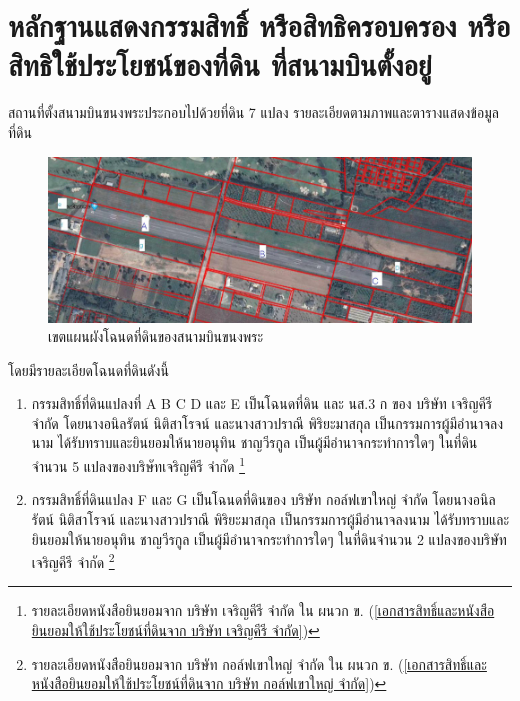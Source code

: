 \section{หลักฐานแสดงกรรมสิทธิ์ หรือสิทธิครอบครอง หรือสิทธิใช้ประโยชน์ของที่ดิน ที่สนามบินตั้งอยู่}

สถานที่ตั้งสนามบินขนงพระประกอบไปด้วยที่ดิน 7 แปลง รายละเอียดตามภาพและตารางแสดงข้อมูลที่ดิน

\begin{figure}[htbp]
\begin{center}
\includegraphics[width=\linewidth]{Picture7.png}
\caption{เขตแผนผังโฉนดที่ดินของสนามบินขนงพระ}
\label{default}
\end{center}
\end{figure}

โดยมีรายละเอียดโฉนดที่ดินดังนี้

\begin{enumerate}
\item กรรมสิทธิ์ที่ดินแปลงที่ A B C D และ E เป็นโฉนดที่ดิน และ นส.3 ก ของ บริษัท เจริญคีรี จำกัด โดยนางอนิลรัตน์ นิติสาโรจน์ และนางสาวปราณี พิริยะมาสกุล เป็นกรรมการผู้มีอำนาจลงนาม ได้รับทราบและยินยอมให้นายอนุทิน ชาญวีรกูล เป็นผู้มีอำนาจกระทำการใดๆ ในที่ดินจำนวน 5 แปลงของบริษัทเจริญคีรี จำกัด \footnote{รายละเอียดหนังสือยินยอมจาก บริษัท เจริญคีรี จำกัด ใน ผนวก ข. (\ref{เอกสารสิทธิ์และหนังสือยินยอมให้ใช้ประโยชน์ที่ดินจาก บริษัท เจริญคีรี จำกัด})}
\item กรรมสิทธิ์ที่ดินแปลง F และ G เป็นโฉนดที่ดินของ บริษัท กอล์ฟเขาใหญ่ จำกัด โดยนางอนิลรัตน์ นิติสาโรจน์ และนางสาวปราณี พิริยะมาสกุล เป็นกรรมการผู้มีอำนาจลงนาม ได้รับทราบและยินยอมให้นายอนุทิน ชาญวีรกูล เป็นผู้มีอำนาจกระทำการใดๆ ในที่ดินจำนวน 2 แปลงของบริษัทเจริญคีรี จำกัด \footnote{รายละเอียดหนังสือยินยอมจาก บริษัท กอล์ฟเขาใหญ่ จำกัด ใน ผนวก ข. (\ref{เอกสารสิทธิ์และหนังสือยินยอมให้ใช้ประโยชน์ที่ดินจาก บริษัท กอล์ฟเขาใหญ่ จำกัด})}
\end{enumerate}


